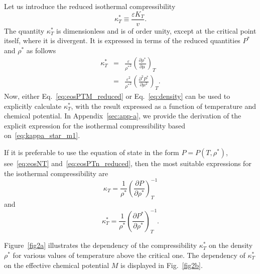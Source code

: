 Let us introduce the reduced isothermal compressibility
\begin{equation}
	\kappa^*_T \equiv \frac{\varepsilon K_T}{v}.
\end{equation}
The quantity $\kappa^*_T$ is dimensionless and is of order unity, except at the critical point itself, where it is divergent. It is expressed in terms of the reduced quantities $P^*$ and $\rho^*$ as follows
\begin{eqnarray}
	\label{eq:kappa_star_m1}
	\kappa^*_T & = & \frac{\varepsilon}{{\rho^*}^2} \left(\frac{\partial \rho^*}{\partial \mu}\right)_T
	\\
	\label{eq:kappa_star_m}
	& = & \frac{\varepsilon^2}{{\rho^*}^2} \left(\frac{\partial^2 P^*}{\partial \mu^2}\right)_T.
\end{eqnarray}
Now, either Eq.~\eqref{eq:eosPTM_reduced} or Eq.~\eqref{eq:density} can be used to explicitly calculate $\kappa^*_T$, with the result expressed as a function of temperature and chemical potential. In Appendix~\ref{sec:app-a}, we provide the derivation of the explicit expression for the isothermal compressibility based on~\eqref{eq:kappa_star_m1}.

If it is preferable to use the equation of state in the form $P=P(T, \rho^*)$, see~\eqref{eq:eosNT} and~\eqref{eq:eosPTn_reduced}, then the most suitable expressions for the isothermal compressibility are
\begin{equation}
	\kappa_T = \frac{1}{\rho^*} \left(\frac{\partial P}{\partial \rho^*}\right)^{-1}_T
\end{equation}
and 
\begin{equation}
	\kappa^*_T = \frac{1}{\rho^*} \left(\frac{\partial P^*}{\partial \rho^*}\right)^{-1}_T.
\end{equation}

Figure~\ref{fig2a} illustrates the dependency of the compressibility $\kappa^*_T$ on the density $\rho^*$ for various values of temperature above the critical one. The dependency of $\kappa^*_T$ on the effective chemical potential $M$ is displayed in Fig.~\ref{fig2b}.

